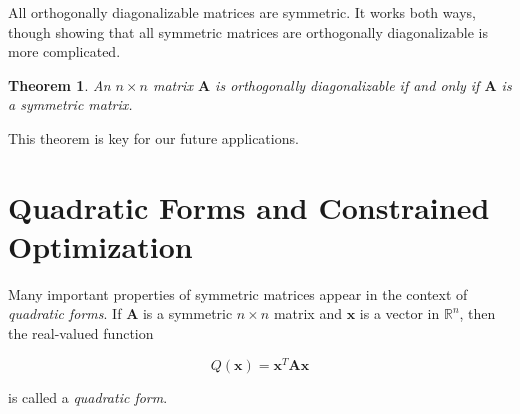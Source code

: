 \documentclass[
]{book}
\newtheorem{theorem}{Theorem}[chapter]
\theoremstyle{definition}
\theoremstyle{definition}
\theoremstyle{definition}
\theoremstyle{definition}
\theoremstyle{remark}
\begin{document}
All orthogonally diagonalizable matrices are symmetric. It works both ways, though showing that all symmetric matrices are orthogonally diagonalizable is more complicated.

\begin{theorembox}

\begin{theorem}
An \(n\times n\) matrix \(\mathbf{A}\) is orthogonally diagonalizable if and only if \(\mathbf{A}\) is a symmetric matrix.
\end{theorem}

\end{theorembox}

This theorem is key for our future applications.

\section{Quadratic Forms and Constrained Optimization}\label{quadratic-forms-and-constrained-optimization}

Many important properties of symmetric matrices appear in the context of \emph{quadratic forms}. If \(\mathbf{A}\) is a symmetric \(n\times n\) matrix and \(\mathbf{x}\) is a vector in \(\mathbb{R}^n\), then the real-valued function

\[Q(\mathbf{x})=\mathbf{x}^T\mathbf{A}\mathbf{x}\]

is called a \emph{quadratic form}.
\end{document}

